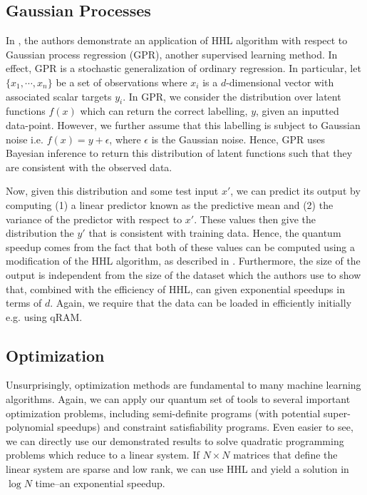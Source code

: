 \documentclass[12]{amsart}
\newcommand\0{\mathbf{0}}
\newcommand\<{\langle}
\renewcommand\>{\rangle}
\begin{document}
\subsection{Gaussian Processes}

In \cite{zhao2018quantum}, the authors demonstrate an application of HHL algorithm with respect to Gaussian process regression (GPR), another supervised learning method. In effect, GPR is a stochastic generalization of ordinary regression. In particular, let $\{ x_1 , \cdots , x_n \}$ be a set of observations where $x_i$ is a $d$-dimensional vector with associated scalar targets $y_i$. In GPR, we consider the distribution over latent functions $f(x)$ which can return the correct labelling, $y$, given an inputted data-point. However, we further assume that this labelling is subject to Gaussian noise i.e. $f(x) = y + \epsilon$, where $\epsilon$ is the Gaussian noise. Hence, GPR uses Bayesian inference to return this distribution of latent functions such that they are consistent with the observed data. 

Now, given this distribution and some test input $x'$, we can predict its output by computing (1) a linear predictor known as the predictive mean and (2) the variance of the predictor with respect to $x'$. These values then give the distribution the $y'$ that is consistent with training data. Hence, the quantum speedup comes from the fact that both of these values can be computed using a modification of the HHL algorithm, as described in \cite{zhao2018quantum}. Furthermore, the size of the output is independent from the size of the dataset which the authors use to show that, combined with the efficiency of HHL, can given exponential speedups in terms of $d$. Again, we require that the data can be loaded in efficiently initially e.g. using qRAM.  

\subsection{Optimization}

Unsurprisingly, optimization methods are fundamental to many machine learning algorithms. Again, we can apply our quantum set of tools to several important optimization problems, including semi-definite programs (with potential super-polynomial speedups) and constraint satisfiability programs. Even easier to see, we can directly use our demonstrated results to solve quadratic programming problems which reduce to a linear system. If $N \times N$ matrices that define the linear system are sparse and low rank, we can use HHL and yield a solution in $\log N$ time--an exponential speedup.
\end{document}
